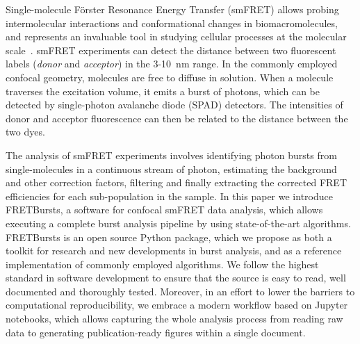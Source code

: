 Single-molecule Förster Resonance Energy Transfer (smFRET) allows probing intermolecular interactions
and conformational changes in biomacromolecules, and represents an 
invaluable tool in studying cellular processes at the molecular 
scale~\cite{Kapanidis_2006}. smFRET experiments can detect the distance between 
two fluorescent labels (\textit{donor} and \textit{acceptor}) in the 
3-10~nm range. In the commonly employed confocal geometry, molecules are free 
to diffuse in solution. When a molecule traverses the excitation volume, it 
emits a burst of photons, which can be detected by single-photon avalanche diode (SPAD) detectors. 
The intensities of donor and acceptor fluorescence 
can then be related to the distance between the two dyes.

The analysis of smFRET experiments involves identifying photon bursts from 
single-molecules in a continuous stream of photon, estimating the 
background and other correction factors, filtering and finally extracting the corrected 
FRET efficiencies for each sub-population in the sample. In this paper we introduce FRETBursts,
a software for confocal smFRET data analysis, which 
allows executing a complete burst analysis pipeline by using state-of-the-art algorithms.
FRETBursts is an open source Python package, which we propose as both a toolkit 
for research and new developments in burst analysis, and as a reference implementation of commonly employed algorithms.
We follow the highest standard in software development to ensure that 
the source is easy to read, well documented and thoroughly tested. 
Moreover, in an effort to lower the barriers to computational reproducibility, 
we embrace a modern workflow based on Jupyter notebooks, which allows capturing the whole analysis process from reading raw data to generating publication-ready figures within a single document.
